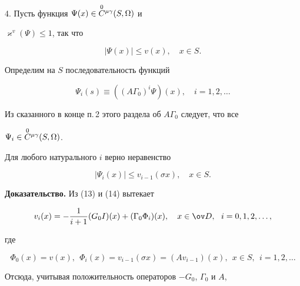 \medskip 


 


4. Пусть функция $\Psi(x)\in\overset{0}{C}{}^{\mu\gamma}(S,\Omega)$ и 


$\varkappa^v(\Psi)\le1$, так что 


\begin{equation} 


|\Psi(x)|\le v(x),\quad x\in S. 


\end{equation} 


Определим на $S$ последовательность функций 


\begin{equation} 


\Psi_i(s)\equiv((A\Gamma_0)^i\Psi)(x),\quad i=1,2,\dotsc 


\end{equation} 


Из сказанного в конце п.\,2 этого раздела об $A\Gamma_0$ следует, что все 


$\Psi_i\in\overset{0}{C}{}^{\mu\gamma}(S,\Omega)$. 


 


\begin{prop} 


Для любого натурального $i$ верно неравенство 


\begin{equation} 


|\Psi_i(x)|\le v_{i-1}(\sigma x),\quad x\in S. 


\end{equation} 


\end{prop} 


 


{\bf Доказательство.} Из (13) и (14) вытекает


$$ 


v_i(x)=-\frac{1}{i+1}(G_0I)(x)+(\Gamma_0\Phi_i)(x),\quad 


x\in \ov D,\ \ i=0,1,2,\dotsc, 


$$ 


где 


$$ 


\Phi_0(x)=v(x),\ \ \Phi_i(x)=v_{i-1}(\sigma x)= 


(A v_{i-1})(x),\ \ x\in S,\ \ i=1,2,\dotsc 


$$ 


Отсюда, учитывая положительность операторов $-G_0$, $\Gamma_0$ и $A$, 


